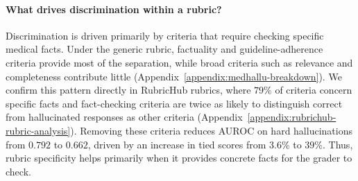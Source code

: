\documentclass{article}
\begin{document}
\paragraph{\textbf{What drives discrimination within a rubric?}}
Discrimination is driven primarily by criteria that require checking specific medical facts. Under the generic rubric, factuality and guideline-adherence criteria provide most of the separation, while broad criteria such as relevance and completeness contribute little (Appendix~\ref{appendix:medhallu-breakdown}). We confirm this pattern directly in RubricHub rubrics, where $79$\% of criteria concern specific facts and fact-checking criteria are twice as likely to distinguish correct from hallucinated responses as other criteria (Appendix~\ref{appendix:rubrichub-rubric-analysis}). Removing these criteria reduces AUROC on hard hallucinations from $0.792$ to $0.662$, driven by an increase in tied scores from $3.6$\% to $39$\%. Thus, rubric specificity helps primarily when it provides concrete facts for the grader to check.


\end{document}
